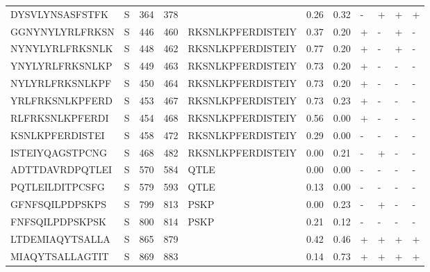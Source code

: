 \begin{tabular}{llrrlrrllll}
DYSVLYNSASFSTFK &       S &    364 &   378 &                    &            0.26 &             0.32 &      - &       + &      + &       + \\
GGNYNYLYRLFRKSN &       S &    446 &   460 &  RKSNLKPFERDISTEIY &            0.37 &             0.20 &      + &       - &      + &       - \\
NYNYLYRLFRKSNLK &       S &    448 &   462 &  RKSNLKPFERDISTEIY &            0.77 &             0.20 &      + &       - &      + &       - \\
YNYLYRLFRKSNLKP &       S &    449 &   463 &  RKSNLKPFERDISTEIY &            0.73 &             0.20 &      + &       - &      - &       - \\
NYLYRLFRKSNLKPF &       S &    450 &   464 &  RKSNLKPFERDISTEIY &            0.73 &             0.20 &      + &       - &      - &       - \\
YRLFRKSNLKPFERD &       S &    453 &   467 &  RKSNLKPFERDISTEIY &            0.73 &             0.23 &      + &       - &      - &       - \\
RLFRKSNLKPFERDI &       S &    454 &   468 &  RKSNLKPFERDISTEIY &            0.56 &             0.00 &      + &       - &      - &       - \\
KSNLKPFERDISTEI &       S &    458 &   472 &  RKSNLKPFERDISTEIY &            0.29 &             0.00 &      - &       - &      - &       - \\
ISTEIYQAGSTPCNG &       S &    468 &   482 &  RKSNLKPFERDISTEIY &            0.00 &             0.21 &      - &       + &      - &       - \\
ADTTDAVRDPQTLEI &       S &    570 &   584 &               QTLE &            0.00 &             0.00 &      - &       - &      - &       - \\
PQTLEILDITPCSFG &       S &    579 &   593 &               QTLE &            0.13 &             0.00 &      - &       - &      - &       - \\
GFNFSQILPDPSKPS &       S &    799 &   813 &               PSKP &            0.00 &             0.23 &      - &       + &      - &       - \\
FNFSQILPDPSKPSK &       S &    800 &   814 &               PSKP &            0.21 &             0.12 &      - &       - &      - &       - \\
LTDEMIAQYTSALLA &       S &    865 &   879 &                    &            0.42 &             0.46 &      + &       + &      + &       + \\
MIAQYTSALLAGTIT &       S &    869 &   883 &                    &            0.14 &             0.73 &      + &       + &      + &       + \\

\end{tabular}
